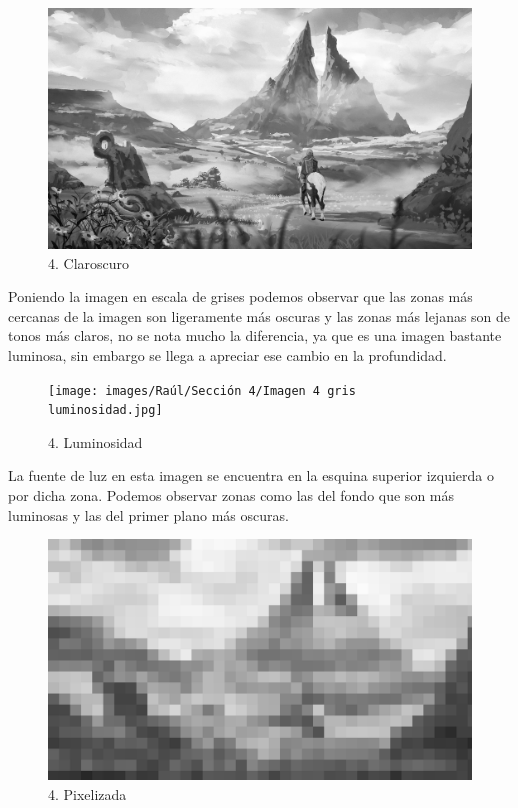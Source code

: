\documentclass[12pt]{article}
\begin{document}
\begin{figure}[H]
      \centering
      \includegraphics[scale=0.1]{images/Raúl/Sección 4/Imagen 4 gris.jpg}
      \caption{\small 4. Claroscuro}
\end{figure} 

Poniendo la imagen en escala de grises podemos observar que las zonas más cercanas de la imagen son ligeramente más oscuras y las zonas más lejanas son de tonos más claros, no se nota mucho la diferencia, ya que es una imagen bastante luminosa, sin embargo se llega a apreciar ese cambio en la profundidad.

\begin{figure}[H]
      \centering
      \texttt{[image: images/Raúl/Sección 4/Imagen 4 gris luminosidad.jpg]}
      \caption{\small 4. Luminosidad}
\end{figure}

La fuente de luz en esta imagen se encuentra en la esquina superior izquierda o por dicha zona. Podemos observar zonas como las del fondo que son más luminosas y las del primer plano más oscuras.

\begin{figure}[H]
      \centering
      \includegraphics[scale=0.1]{images/Raúl/Sección 4/Imagen 4 gris pixel.jpg}
      \caption{\small 4. Pixelizada}
\end{figure}
\end{document}
